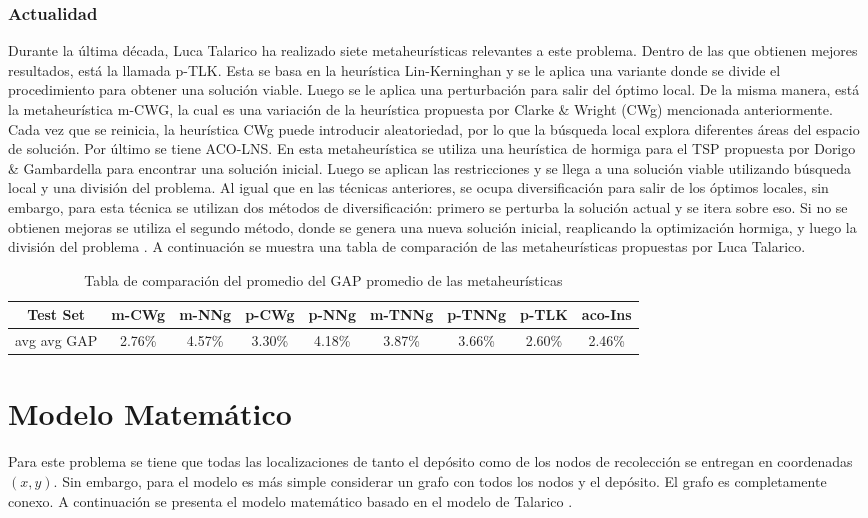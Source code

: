 \documentclass[letter, 10pt]{article}
\begin{document}
\subsubsection{Actualidad}
Durante la última década, Luca Talarico ha realizado siete metaheurísticas relevantes a este problema. Dentro de las que obtienen mejores resultados, está la llamada p-TLK. Esta se basa en la heurística Lin-Kerninghan \cite{helsgaun2000effective} y se le aplica una variante donde se divide el procedimiento para obtener una solución viable. Luego se le aplica una perturbación para salir del óptimo local. De la misma manera, está la metaheurística m-CWG, la cual es una variación de la heurística propuesta por Clarke \& Wright (CWg) mencionada anteriormente. Cada vez que se reinicia, la heurística CWg puede introducir aleatoriedad, por lo que la búsqueda local explora diferentes áreas del espacio de solución. Por último se tiene ACO-LNS. En esta metaheurística se utiliza una heurística de hormiga para el TSP propuesta por Dorigo \& Gambardella para encontrar una solución inicial. Luego se aplican las restricciones y se llega a una solución viable utilizando búsqueda local y una división del problema. Al igual que en las técnicas anteriores, se ocupa diversificación para salir de los óptimos locales, sin embargo, para esta técnica se utilizan dos métodos de diversificación: primero se perturba la solución actual y se itera sobre eso. Si no se obtienen mejoras se utiliza el segundo método, donde se genera una nueva solución inicial, reaplicando la optimización hormiga, y luego la división del problema \cite{talarico2017large}. A continuación se muestra una tabla de comparación de las metaheurísticas propuestas por Luca Talarico. 

\begin{table}[H]
    \begin{tabular}{|c|c|c|c|c|c|c|c|c|}
    \hline
    Test Set    & m-CWg  & m-NNg  & p-CWg  & p-NNg  & m-TNNg & p-TNNg & p-TLK  & aco-Ins \\ \hline
    avg avg GAP & 2.76\% & 4.57\% & 3.30\% & 4.18\% & 3.87\% & 3.66\% & 2.60\% & 2.46\%  \\ \hline
    \end{tabular}
    \caption{Tabla de comparación del promedio del GAP promedio de las metaheurísticas \cite{talarico2017large}}
    \label{fig:my-table}
\end{table}
\newpage
\section{Modelo Matem\'atico}
Para este problema se tiene que todas las localizaciones de tanto el depósito como de los nodos de recolección se entregan en coordenadas $(x,y)$. Sin embargo, para el modelo es más simple considerar un grafo con todos los nodos y el depósito. El grafo es completamente conexo. 
A continuación se presenta el modelo matemático basado en el modelo de Talarico \cite{talarico2015metaheuristics}.
\end{document}
